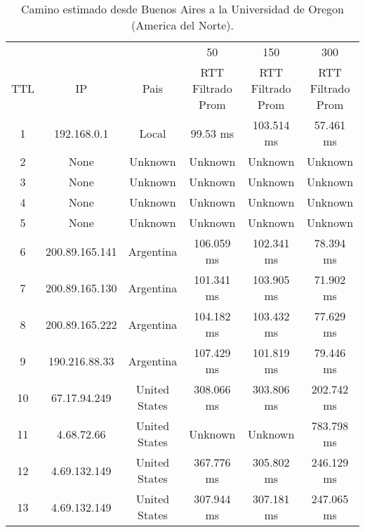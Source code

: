 \begin{table}[H]
\centering
\caption{Camino estimado desde Buenos Aires a la Universidad de Oregon (America del Norte).}
\begin{tabular}{ | c | c | c | c | c | c | }
	\hline 
  & & & 50	& 150	& 300 \\ %
TTL	&          IP         	     &    Pais        & 	 RTT Filtrado Prom  	&  RTT Filtrado Prom  & 	 RTT Filtrado Prom  \\ \hline  
1	& 192.168.0.1       &   	       Local      &   	       99.53 ms    &  	     103.514 ms   &   	      57.461 ms   \\ \hline    
2	& None               &  	      Unknown     &   	      Unknown      &  	      Unknown     &   	      Unknown     \\ \hline    
3	& None               &  	      Unknown     &   	      Unknown      &  	      Unknown     &   	      Unknown     \\ \hline    
4	& None               &  	      Unknown     &   	      Unknown      &  	      Unknown     &   	      Unknown     \\ \hline    
5	& None               &  	      Unknown     &   	      Unknown      &  	      Unknown     &   	      Unknown     \\ \hline    
6	& 200.89.165.141    &   	     Argentina    &   	     106.059 ms    &  	     102.341 ms   &   	      78.394 ms   \\ \hline    
7	& 200.89.165.130    &   	     Argentina    &   	     101.341 ms    &  	     103.905 ms   &   	      71.902 ms   \\ \hline    
8	& 200.89.165.222    &   	     Argentina    &   	     104.182 ms    &  	     103.432 ms   &   	      77.629 ms   \\ \hline    
9	& 190.216.88.33     &   	     Argentina    &   	     107.429 ms    &  	     101.819 ms   &   	      79.446 ms   \\ \hline    
10	& 67.17.94.249     &    	   United States  &   	     308.066 ms    &  	     303.806 ms   &   	     202.742 ms   \\ \hline    
11	& 4.68.72.66        &   	   United States &   	      Unknown      &  	      Unknown     &   	     783.798 ms   \\ \hline    
12	& 4.69.132.149    &     	   United States  &   	     367.776 ms    &  	     305.802 ms   &   	     246.129 ms   \\ \hline    
13	& 4.69.132.149    &     	   United States  &   	     307.944 ms    &  	     307.181 ms   &   	     247.065 ms   \\ \hline    

\end{tabular}
\end{table}
